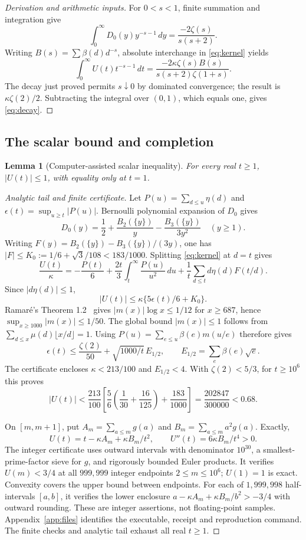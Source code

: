\documentclass[11pt]{article}
\newtheorem{lemma}[theorem]{Lemma}
\theoremstyle{remark}\newtheorem{remark}[theorem]{Remark}
\begin{document}
\begin{proof}[Derivation and arithmetic inputs]
For $0<s<1$, finite summation and integration give
\[
 \int_0^\infty D_0(y)y^{-s-1}\,dy=\frac{-2\zeta(s)}{s(s+2)}.
\]
Writing $B(s)=\sum\beta(d)d^{-s}$, absolute interchange in \eqref{eq:kernel} yields
\[
 \int_0^\infty U(t)t^{-s-1}\,dt
 =\frac{-2\kappa\zeta(s)B(s)}{s(s+2)\zeta(1+s)}.
\]
The decay just proved permits $s\downarrow0$ by dominated convergence; the result is $\kappa\zeta(2)/2$. Subtracting the integral over $(0,1)$, which equals one, gives \eqref{eq:decay}.
\end{proof}

\subsection{The scalar bound and completion}
\begin{lemma}[Computer-assisted scalar inequality]\label{lem:scalar}
For every real $t\ge1$, $|U(t)|\le1$, with equality only at $t=1$.
\end{lemma}
\begin{proof}[Analytic tail and finite certificate]
Let $P(u)=\sum_{d\le u}\eta(d)$ and $\epsilon(t)=\sup_{u\ge t}|P(u)|$. Bernoulli polynomial expansion of $D_0$ gives
\[
 D_0(y)=\frac12+\frac{B_2(\{y\})}{y}-\frac{B_3(\{y\})}{3y^2}
 \quad(y\ge1).
\]
Writing $F(y)=B_2(\{y\})-B_3(\{y\})/(3y)$, one has
$|F|\le K_0:=1/6+\sqrt3/108<183/1000$. Splitting \eqref{eq:kernel} at $d=t$ gives
\[
 \frac{U(t)}\kappa=-\frac{P(t)}6+\frac{2t}3\int_t^\infty\frac{P(u)}{u^2}\,du
       +\frac1t\sum_{d\le t}d\eta(d)F(t/d).
\]
Since $|d\eta(d)|\le1$,
\[
 |U(t)|\le\kappa\{5\epsilon(t)/6+K_0\}.
\]
Ramar\'e's Theorem 1.2~\cite{ramare} gives $|m(x)|\log x\le1/12$ for $x\ge687$, hence $\sup_{x\ge1000}|m(x)|\le1/50$. The global bound $|m(x)|\le1$ follows from $\sum_{d\le x}\mu(d)\lfloor x/d\rfloor=1$. Using $P(u)=\sum_{e\le u}\beta(e)m(u/e)$ therefore gives
\[
 \epsilon(t)\le\frac{\zeta(2)}{50}+\sqrt{1000/t}\,E_{1/2},
 \qquad E_{1/2}=\sum_e\beta(e)\sqrt e.
\]
The certificate encloses $\kappa<213/100$ and $E_{1/2}<4$. With $\zeta(2)<5/3$, for $t\ge10^6$ this proves
\[
 |U(t)|<\frac{213}{100}\left[\frac56\left(\frac1{30}+\frac{16}{125}\right)+\frac{183}{1000}\right]
 =\frac{202847}{300000}<0.68.
\]

On $[m,m+1]$, put $A_m=\sum_{a\le m}g(a)$ and $B_m=\sum_{a\le m}a^2g(a)$. Exactly,
\[
 U(t)=t-\kappa A_m+\kappa B_m/t^2,\qquad U''(t)=6\kappa B_m/t^4>0.
\]
The integer certificate uses outward intervals with denominator $10^{30}$, a smallest-prime-factor sieve for $g$, and rigorously bounded Euler products. It verifies $U(m)<3/4$ at all $999{,}999$ integer endpoints $2\le m\le10^6$; $U(1)=1$ is exact. Convexity covers the upper bound between endpoints. For each of $1{,}999{,}998$ half-intervals $[a,b]$, it verifies the lower enclosure
$a-\kappa A_m+\kappa B_m/b^2>-3/4$ with outward rounding. These are integer assertions, not floating-point samples. Appendix~\ref{app:files} identifies the executable, receipt and reproduction command. The finite checks and analytic tail exhaust all real $t\ge1$.
\end{proof}
\end{document}
